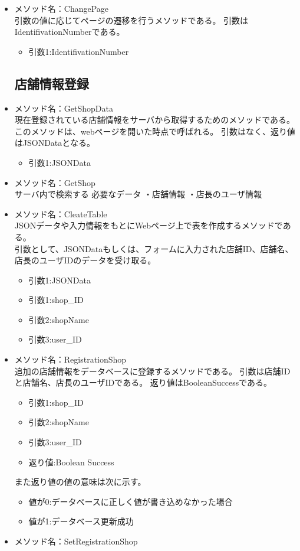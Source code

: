 \documentclass[a4j]{jarticle}
\begin{document}
\begin{itemize}
\item メソッド名：ChangePage\\

引数の値に応じてページの遷移を行うメソッドである。
引数はIdentifivationNumberである。

	\begin{itemize}
		\item 引数1:IdentifivationNumber
	\end{itemize}
	
\subsection{店舗情報登録}
%
\item メソッド名：GetShopData\\

現在登録されている店舗情報をサーバから取得するためのメソッドである。このメソッドは、webページを開いた時点で呼ばれる。
引数はなく、返り値はJSONDataとなる。
	\begin{itemize}
		\item 引数1:JSONData
	\end{itemize}
\item メソッド名：GetShop\\

サーバ内で検索する
必要なデータ
・店舗情報
・店長のユーザ情報

\item メソッド名：CleateTable\\
JSONデータや入力情報をもとにWebページ上で表を作成するメソッドである。\\
引数として、JSONDataもしくは、フォームに入力された店舗ID、店舗名、店長のユーザIDのデータを受け取る。
	\begin{itemize}
		\item 引数1:JSONData
		
		
		\item 引数1:shop\_ID
		\item 引数2:shopName
		\item 引数3:user\_ID
	\end{itemize}
\item メソッド名：RegistrationShop\\

追加の店舗情報をデータベースに登録するメソッドである。
引数は店舗IDと店舗名、店長のユーザIDである。
返り値はBooleanSuccessである。
	\begin{itemize}
		\item 引数1:shop\_ID
		\item 引数2:shopName
		\item 引数3:user\_ID
		\item 返り値:Boolean Success
	\end{itemize}
また返り値の値の意味は次に示す。
	\begin{itemize}
		\item 値が0:データベースに正しく値が書き込めなかった場合
		\item 値が1:データベース更新成功
	\end{itemize}
\item メソッド名：SetRegistrationShop\\



\end{itemize}
\end{document}
